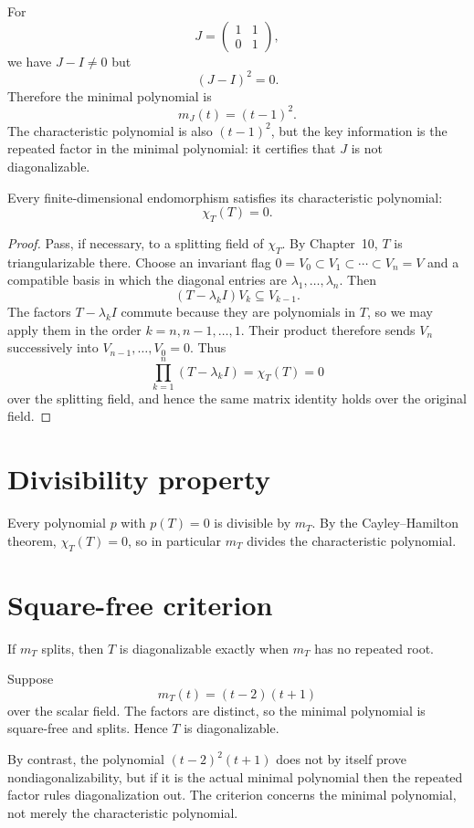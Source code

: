 \begin{example}\label{ex:i11-expand-02}
For
\[
J=\begin{pmatrix}1&1\\0&1\end{pmatrix},
\]
we have \(J-I\neq0\) but
\[
(J-I)^2=0.
\]
Therefore the minimal polynomial is
\[
m_J(t)=(t-1)^2.
\]
The characteristic polynomial is also \((t-1)^2\), but the key information is
the repeated factor in the minimal polynomial: it certifies that \(J\) is not
diagonalizable.
\end{example}
\begin{theorem}\label{thm:i11-03}
Every finite-dimensional endomorphism satisfies its characteristic polynomial:
\[
\chi_T(T)=0.
\]
\begin{proof}
Pass, if necessary, to a splitting field of \(\chi_T\). By Chapter~10, \(T\)
is triangularizable there. Choose an invariant flag
\(0=V_0\subset V_1\subset\cdots\subset V_n=V\) and a compatible basis in
which the diagonal entries are \(\lambda_1,\ldots,\lambda_n\). Then
\[
(T-\lambda_k I)V_k\subseteq V_{k-1}.
\]
The factors \(T-\lambda_kI\) commute because they are polynomials in \(T\), so
we may apply them in the order \(k=n,n-1,\ldots,1\). Their product therefore
sends \(V_n\) successively into \(V_{n-1},\ldots,V_0=0\). Thus
\[
\prod_{k=1}^n(T-\lambda_kI)=\chi_T(T)=0
\]
over the splitting field, and hence the same matrix identity holds over the
original field.
\end{proof}
\end{theorem}

\section{Divisibility property}
Every polynomial $p$ with $p(T)=0$ is divisible by $m_T$. By the Cayley--Hamilton theorem, $\chi_T(T)=0$, so in particular $m_T$ divides the characteristic polynomial.

\section{Square-free criterion}
If $m_T$ splits, then $T$ is diagonalizable exactly when $m_T$ has no repeated root.


\begin{example}\label{ex:i11-expand-03}
Suppose
\[
m_T(t)=(t-2)(t+1)
\]
over the scalar field. The factors are distinct, so the minimal polynomial is
square-free and splits. Hence \(T\) is diagonalizable.

By contrast, the polynomial \((t-2)^2(t+1)\) does not by itself prove
nondiagonalizability, but if it is the actual minimal polynomial then the
repeated factor rules diagonalization out. The criterion concerns the minimal
polynomial, not merely the characteristic polynomial.
\end{example}
